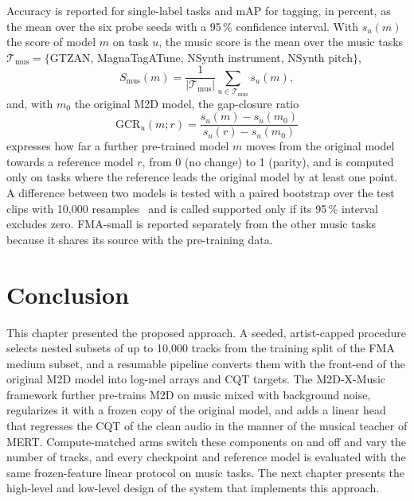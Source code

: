 \documentclass{FastFyp}
\begin{document}
Accuracy is reported for single-label tasks and mAP for tagging, in percent, as the mean over the six probe seeds with a 95\,\% confidence interval. With $s_u(m)$ the score of model $m$ on task $u$, the music score is the mean over the music tasks $\mathcal{T}_{\mathrm{mus}}=\{$GTZAN, MagnaTagATune, NSynth instrument, NSynth pitch$\}$,
\begin{equation}
S_{\mathrm{mus}}(m)=\frac{1}{|\mathcal{T}_{\mathrm{mus}}|}\sum_{u\in\mathcal{T}_{\mathrm{mus}}}s_u(m),
\label{eq:m5-agg}
\end{equation}
and, with $m_0$ the original M2D model, the gap-closure ratio
\begin{equation}
\mathrm{GCR}_u(m;r)=\frac{s_u(m)-s_u(m_0)}{s_u(r)-s_u(m_0)}
\label{eq:m5-gcr}
\end{equation}
expresses how far a further pre-trained model $m$ moves from the original model towards a reference model $r$, from 0 (no change) to 1 (parity), and is computed only on tasks where the reference leads the original model by at least one point. A difference between two models is tested with a paired bootstrap over the test clips with 10,000 resamples~\cite{ref:Efron:1993bootstrap} and is called supported only if its 95\,\% interval excludes zero. FMA-small is reported separately from the other music tasks because it shares its source with the pre-training data.

\FloatBarrier
\section{Conclusion}
\label{sec:m5-conclusion}
This chapter presented the proposed approach. A seeded, artist-capped procedure selects nested subsets of up to 10,000 tracks from the training split of the FMA medium subset, and a resumable pipeline converts them with the front-end of the original M2D model into log-mel arrays and CQT targets. The M2D-X-Music framework further pre-trains M2D on music mixed with background noise, regularizes it with a frozen copy of the original model, and adds a linear head that regresses the CQT of the clean audio in the manner of the musical teacher of MERT. Compute-matched arms switch these components on and off and vary the number of tracks, and every checkpoint and reference model is evaluated with the same frozen-feature linear protocol on music tasks. The next chapter presents the high-level and low-level design of the system that implements this approach.
\end{document}
